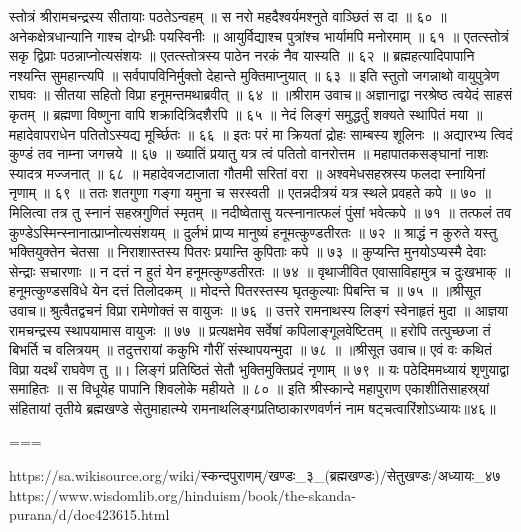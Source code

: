 स्तोत्रं श्रीरामचन्द्रस्य सीतायाः पठतेऽन्वहम् ॥
स नरो महदैश्वर्यमश्नुते वाञ्छितं स दा ॥ ६० ॥
अनेकक्षेत्रधान्यानि गाश्च दोग्ध्रीः पयस्विनीः ॥
आयुर्विद्याश्च पुत्रांश्च भार्यामपि मनोरमाम् ॥ ६१ ॥
एतत्स्तोत्रं सकृ द्विप्राः पठन्नाप्नोत्यसंशयः ॥
एतत्स्तोत्रस्य पाठेन नरकं नैव यास्यति ॥ ६२ ॥
ब्रह्महत्यादिपापानि नश्यन्ति सुमहान्त्यपि ॥
सर्वपापविनिर्मुक्तो देहान्ते मुक्तिमाप्नुयात् ॥ ६३ ॥
इति स्तुतो जगन्नाथो वायुपुत्रेण राघवः ॥
सीतया सहितो विप्रा हनूमन्तमथाब्रवीत् ॥ ६४ ॥
॥श्रीराम उवाच॥
अज्ञानाद्वा नरश्रेष्ठ त्वयेदं साहसं कृतम् ॥
ब्रह्मणा विष्णुना वापि शक्रादित्रिदशैरपि ॥ ६५ ॥
नेदं लिङ्गं समुद्धर्तुं शक्यते स्थापितं मया ॥
महादेवापराधेन पतितोऽस्यद्य मूर्च्छितः ॥ ६६ ॥
इतः परं मा क्रियतां द्रोहः साम्बस्य शूलिनः ॥
अद्यारभ्य त्विदं कुण्डं तव नाम्ना जगत्त्रये ॥ ६७ ॥
ख्यातिं प्रयातु यत्र त्वं पतितो वानरोत्तम ॥
महापातकसङ्घानां नाशः स्यादत्र मज्जनात् ॥ ६८ ॥
महादेवजटाजाता गौतमी सरितां वरा ॥
अश्वमेधसहस्रस्य फलदा स्नायिनां नृणाम् ॥ ६९ ॥
ततः शतगुणा गङ्गा यमुना च सरस्वती ॥
एतन्नदीत्रयं यत्र स्थले प्रवहते कपे ॥ ७० ॥
मिलित्वा तत्र तु स्नानं सहस्रगुणितं स्मृतम् ॥
नदीष्वेतासु यत्स्नानात्फलं पुंसां भवेत्कपे ॥ ७१ ॥
तत्फलं तव कुण्डेऽस्मिन्स्नानात्प्राप्नोत्यसंशयम् ॥
दुर्लभं प्राप्य मानुष्यं हनूमत्कुण्डतीरतः ॥ ७२ ॥
श्राद्धं न कुरुते यस्तु भक्तियुक्तेन चेतसा ॥
निराशास्तस्य पितरः प्रयान्ति कुपिताः कपे ॥ ७३ ॥
कुप्यन्ति मुनयोऽप्यस्मै देवाः सेन्द्राः सचारणाः ॥
न दत्तं न हुतं येन हनूमत्कुण्डतीरतः ॥ ७४ ॥
वृथाजीवित एवासाविहामुत्र च दुःखभाक् ॥
हनूमत्कुण्डसविधे येन दत्तं तिलोदकम् ॥
मोदन्ते पितरस्तस्य घृतकुल्याः पिबन्ति च ॥ ७५ ॥
॥श्रीसूत उवाच॥
श्रुत्वैतद्वचनं विप्रा रामेणोक्तं स वायुजः ॥ ७६ ॥
उत्तरे रामनाथस्य लिङ्गं स्वेनाहृतं मुदा ॥
आज्ञया रामचन्द्रस्य स्थापयामास वायुजः ॥ ७७ ॥
प्रत्यक्षमेव सर्वेषां कपिलाङ्गूलवेष्टितम् ॥
हरोपि तत्पुच्छजा तं बिभर्ति च वलित्रयम् ॥
तदुत्तरायां ककुभि गौरीं संस्थापयन्मुदा ॥ ७८ ॥
॥श्रीसूत उवाच॥
एवं वः कथितं विप्रा यदर्थं राघवेण तु ॥।
लिङ्गं प्रतिष्ठितं सेतौ भुक्तिमुक्तिप्रदं नृणाम् ॥ ७९ ॥
यः पठेदिममध्यायं शृणुयाद्वा समाहितः ॥
स विधूयेह पापानि शिवलोके महीयते ॥ ८० ॥
इति श्रीस्कान्दे महापुराण एकाशीतिसाहस्र्यां संहितायां तृतीये ब्रह्मखण्डे सेतुमाहात्म्ये रामनाथलिङ्गप्रतिष्ठाकारणवर्णनं नाम षट्चत्वारिंशोऽध्यायः॥४६॥

===

https://sa.wikisource.org/wiki/स्कन्दपुराणम्/खण्डः_३_(ब्रह्मखण्डः)/सेतुखण्डः/अध्यायः_४७
https://www.wisdomlib.org/hinduism/book/the-skanda-purana/d/doc423615.html

